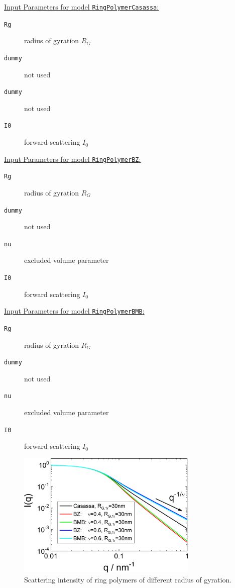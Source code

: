 \vspace{5mm}

\noindent
\uline{Input Parameters for model \texttt{RingPolymerCasassa}:}
\begin{description}
\item[\texttt{Rg}] radius of gyration $R_G$
\item[\texttt{dummy}] not used
\item[\texttt{dummy}] not used
\item[\texttt{I0}] forward scattering $I_0$
\end{description}

\noindent
\uline{Input Parameters for model \texttt{RingPolymerBZ}:}
\begin{description}
\item[\texttt{Rg}] radius of gyration $R_G$
\item[\texttt{dummy}] not used
\item[\texttt{nu}] excluded volume parameter
\item[\texttt{I0}] forward scattering $I_0$
\end{description}

\noindent
\uline{Input Parameters for model \texttt{RingPolymerBMB}:}
\begin{description}
\item[\texttt{Rg}] radius of gyration $R_G$
\item[\texttt{dummy}] not used
\item[\texttt{nu}] excluded volume parameter
\item[\texttt{I0}] forward scattering $I_0$
\end{description}

\begin{figure}[htb]
\begin{center}
\includegraphics[width=0.768\textwidth]{../images/form_factor/polymer_rings/ringIQ.png}
\end{center}
\caption{Scattering intensity of ring polymers of different radius of gyration.} \label{fig:ringIQ}
\end{figure}

